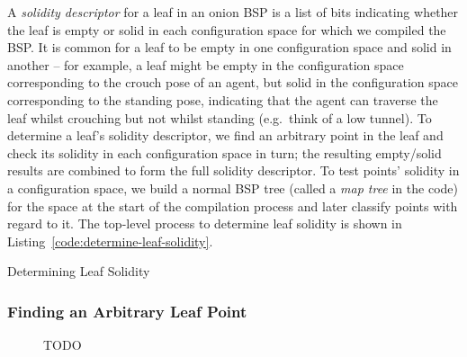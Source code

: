 \documentclass[10pt,twocolumn]{article}
\newenvironment{stusubfig}[1]
{
	\begin{figure}[#1]
	\begin{center}
}
{
	\end{center}
	\end{figure}
}
\begin{document}
A \emph{solidity descriptor} for a leaf in an onion BSP is a list of bits indicating whether the leaf is empty or solid in each configuration space for which we compiled the BSP. It is common for a leaf to be empty in one configuration space and solid in another -- for example, a leaf might be empty in the configuration space corresponding to the crouch pose of an agent, but solid in the configuration space corresponding to the standing pose, indicating that the agent can traverse the leaf whilst crouching but not whilst standing (e.g.~think of a low tunnel). To determine a leaf's solidity descriptor, we find an arbitrary point in the leaf and check its solidity in each configuration space in turn; the resulting empty/solid results are combined to form the full solidity descriptor. To test points' solidity in a configuration space, we build a normal BSP tree (called a \emph{map tree} in the code) for the space at the start of the compilation process and later classify points with regard to it. The top-level process to determine leaf solidity is shown in Listing~\ref{code:determine-leaf-solidity}.

\begin{stulisting}[!t]
\caption{Determining Leaf Solidity}
\label{code:determine-leaf-solidity}

\end{stulisting}

\subsubsection{Finding an Arbitrary Leaf Point}

\begin{stusubfig}{!t}
	\hspace{4mm}%
\caption{TODO}
\label{fig:arbitrary-leaf-point}
\end{stusubfig}
\end{document}
